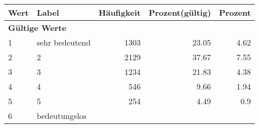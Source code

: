      \begin{longtable}{lXrrr}
     \toprule
     \textbf{Wert} & \textbf{Label} & \textbf{Häufigkeit} & \textbf{Prozent(gültig)} & \textbf{Prozent} \\
     \endhead
     \midrule
     \multicolumn{5}{l}{\textbf{Gültige Werte}}\\

     1 &
     \multicolumn{1}{X}{ sehr bedeutend   } &


       \num{1303} &
       \num[round-mode=places,round-precision=2]{23,05} &
         \num[round-mode=places,round-precision=2]{4,62} \\

     2 &
     \multicolumn{1}{X}{ 2   } &


       \num{2129} &
       \num[round-mode=places,round-precision=2]{37,67} &
         \num[round-mode=places,round-precision=2]{7,55} \\

     3 &
     \multicolumn{1}{X}{ 3   } &


       \num{1234} &
       \num[round-mode=places,round-precision=2]{21,83} &
         \num[round-mode=places,round-precision=2]{4,38} \\

     4 &
     \multicolumn{1}{X}{ 4   } &


       \num{546} &
       \num[round-mode=places,round-precision=2]{9,66} &
         \num[round-mode=places,round-precision=2]{1,94} \\

     5 &
     \multicolumn{1}{X}{ 5   } &


       \num{254} &
       \num[round-mode=places,round-precision=2]{4,49} &
         \num[round-mode=places,round-precision=2]{0,9} \\

     6 &
     \multicolumn{1}{X}{ bedeutungslos   } &



\end{longtable}
